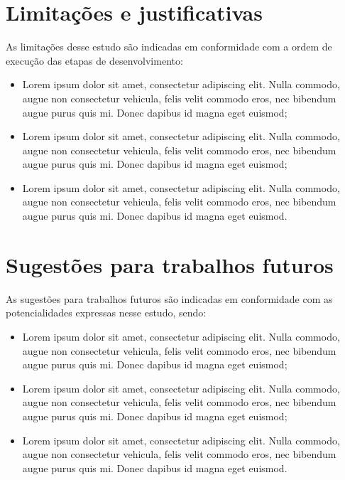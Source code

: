 \documentclass[brazil,hardcopy,openany,a4paper]{_ufscthesis}
\begin{document}
\section{Limitações e justificativas}

As limitações desse estudo são indicadas em conformidade com a ordem de execução das etapas de desenvolvimento:

\begin{itemize}
	\item Lorem ipsum dolor sit amet, consectetur adipiscing elit. Nulla commodo, augue non consectetur vehicula, felis velit commodo eros, nec bibendum augue purus quis mi. Donec dapibus id magna eget euismod;
	
	\item Lorem ipsum dolor sit amet, consectetur adipiscing elit. Nulla commodo, augue non consectetur vehicula, felis velit commodo eros, nec bibendum augue purus quis mi. Donec dapibus id magna eget euismod;
	
	\item Lorem ipsum dolor sit amet, consectetur adipiscing elit. Nulla commodo, augue non consectetur vehicula, felis velit commodo eros, nec bibendum augue purus quis mi. Donec dapibus id magna eget euismod.
	
\end{itemize}

\section{Sugestões para trabalhos futuros}

As sugestões para trabalhos futuros são indicadas em conformidade com as potencialidades expressas nesse estudo, sendo:

\begin{itemize}
	\item Lorem ipsum dolor sit amet, consectetur adipiscing elit. Nulla commodo, augue non consectetur vehicula, felis velit commodo eros, nec bibendum augue purus quis mi. Donec dapibus id magna eget euismod;

	\item Lorem ipsum dolor sit amet, consectetur adipiscing elit. Nulla commodo, augue non consectetur vehicula, felis velit commodo eros, nec bibendum augue purus quis mi. Donec dapibus id magna eget euismod;

	\item Lorem ipsum dolor sit amet, consectetur adipiscing elit. Nulla commodo, augue non consectetur vehicula, felis velit commodo eros, nec bibendum augue purus quis mi. Donec dapibus id magna eget euismod.
	
\end{itemize}
\end{document}
